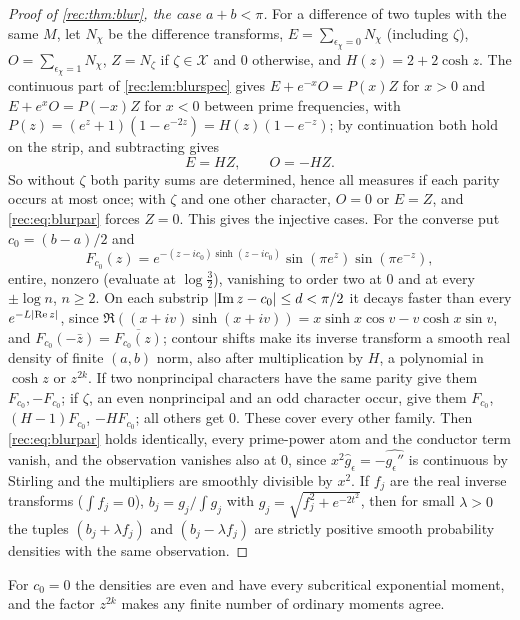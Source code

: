 \begin{proof}[Proof of \cref{rec:thm:blur}, the case $a+b<\pi$]
For a difference of two tuples with the same $M$, let $N_\chi$ be the difference transforms,
$E=\sum_{\epsilon_\chi=0}N_\chi$ (including $\zeta$), $O=\sum_{\epsilon_\chi=1}N_\chi$, $Z=N_\zeta$ if $\zeta\in\mathcal X$ and $0$ otherwise, and $H(z)=2+2\cosh z$.
The continuous part of \cref{rec:lem:blurspec} gives $E+e^{-x}O=P(x)Z$ for $x>0$ and $E+e^xO=P(-x)Z$ for $x<0$ between
prime frequencies, with $P(z)=(e^z+1)(1-e^{-2z})=H(z)(1-e^{-z})$; by continuation both hold on the strip, and
subtracting gives
\begin{equation}\label{rec:eq:blurpar}
 E=HZ,\qquad O=-HZ.
\end{equation}
So without $\zeta$ both parity sums are determined, hence all measures if each parity occurs at most once; with
$\zeta$ and one other character, $O=0$ or $E=Z$, and \eqref{rec:eq:blurpar} forces $Z=0$. This gives the injective cases.
For the converse put $c_0=(b-a)/2$ and
\[
 F_{c_0}(z)=e^{-(z-ic_0)\sinh(z-ic_0)}\sin(\pi e^z)\sin(\pi e^{-z}),
\]
entire, nonzero (evaluate at $\log\tfrac32$), vanishing to order two at $0$ and at every $\pm\log n$, $n\ge2$. On each substrip
$\lvert\operatorname{Im} z-c_0\rvert\le d<\pi/2$ it decays faster than every $e^{-L\lvert\operatorname{Re} z\rvert}$, since
$\Re((x+iv)\sinh(x+iv))=x\sinh x\cos v-v\cosh x\sin v$, and $F_{c_0}(-\bar z)=\overline{F_{c_0}(z)}$; contour shifts make its inverse
transform a smooth real density of finite $(a,b)$ norm, also after multiplication by $H$, a polynomial in $\cosh z$
or $z^{2k}$. If two nonprincipal characters have the same parity give them $F_{c_0},-F_{c_0}$; if $\zeta$, an even
nonprincipal and an odd character occur, give them $F_{c_0}$, $(H-1)F_{c_0}$, $-HF_{c_0}$; all others get $0$. These cover every
other family. Then \eqref{rec:eq:blurpar} holds identically, every prime-power atom and the conductor term vanish,
and the observation vanishes also at $0$, since $x^2\widehat g_\epsilon=-\widehat{g_\epsilon''}$ is continuous by Stirling and the
multipliers are smoothly divisible by $x^2$. If $f_j$ are the real inverse transforms ($\int f_j=0$),
$b_j=g_j/\int g_j$ with $g_j=\sqrt{f_j^2+e^{-2t^2}}$, then for small $\lambda>0$ the tuples $(b_j+\lambda f_j)$ and $(b_j-\lambda f_j)$ are strictly
positive smooth probability densities with the same observation.
\end{proof}

For $c_0=0$ the densities are even and have every subcritical exponential moment, and the factor $z^{2k}$
makes any finite number of ordinary moments agree.

